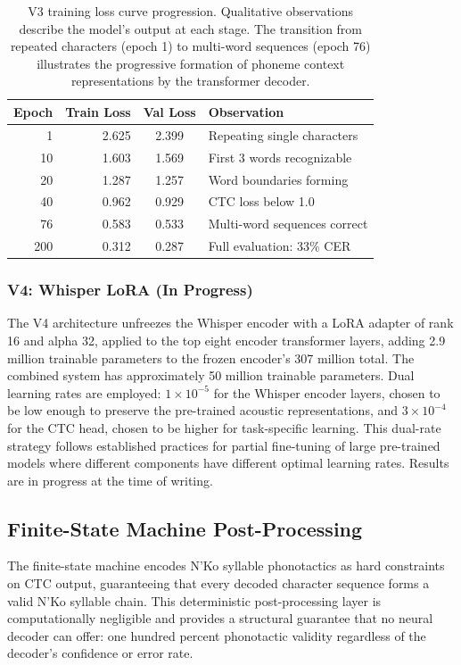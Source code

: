\documentclass[11pt]{article}
\newcommand{\nko}{N'Ko}
\begin{document}
\begin{table}[ht]
\centering
\caption{V3 training loss curve progression. Qualitative observations describe the model's output at each stage. The transition from repeated characters (epoch 1) to multi-word sequences (epoch 76) illustrates the progressive formation of phoneme context representations by the transformer decoder.}
\label{tab:loss_curve}
\begin{tabular}{@{}rrcl@{}}
\toprule
Epoch & Train Loss & Val Loss & Observation \\
\midrule
1 & 2.625 & 2.399 & Repeating single characters \\
10 & 1.603 & 1.569 & First 3 words recognizable \\
20 & 1.287 & 1.257 & Word boundaries forming \\
40 & 0.962 & 0.929 & CTC loss below 1.0 \\
76 & 0.583 & 0.533 & Multi-word sequences correct \\
200 & 0.312 & 0.287 & Full evaluation: 33\% CER \\
\bottomrule
\end{tabular}
\end{table}

\subsubsection{V4: Whisper LoRA (In Progress)}

The V4 architecture unfreezes the Whisper encoder with a LoRA adapter of rank 16 and alpha 32, applied to the top eight encoder transformer layers, adding 2.9 million trainable parameters to the frozen encoder's 307 million total. The combined system has approximately 50 million trainable parameters. Dual learning rates are employed: $1 \times 10^{-5}$ for the Whisper encoder layers, chosen to be low enough to preserve the pre-trained acoustic representations, and $3 \times 10^{-4}$ for the CTC head, chosen to be higher for task-specific learning. This dual-rate strategy follows established practices for partial fine-tuning of large pre-trained models where different components have different optimal learning rates. Results are in progress at the time of writing.

\subsection{Finite-State Machine Post-Processing}
\label{sec:fsm}

The finite-state machine encodes \nko{} syllable phonotactics as hard constraints on CTC output, guaranteeing that every decoded character sequence forms a valid \nko{} syllable chain. This deterministic post-processing layer is computationally negligible and provides a structural guarantee that no neural decoder can offer: one hundred percent phonotactic validity regardless of the decoder's confidence or error rate.
\end{document}
